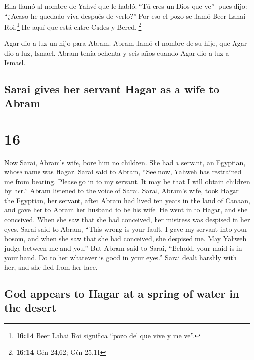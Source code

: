 \begin{paracol}{2}
 Ella llamó al nombre de Yahvé que le habló: ``Tú eres un
Dios que ve'', pues dijo: ``¿Acaso he quedado viva después de verlo?''
 Por eso el pozo se llamó Beer Lahai Roi.\footnote{\textbf{16:14}
  Beer Lahai Roi significa ``pozo del que vive y me ve''.} He aquí que
está entre Cades y Bered. \footnote{\textbf{16:14} Gén 24,62; Gén 25,11}

 Agar dio a luz un hijo para Abram. Abram llamó el nombre
de su hijo, que Agar dio a luz, Ismael.  Abram tenía
ochenta y seis años cuando Agar dio a luz a Ismael.

\switchcolumn
\begin{otherlanguage}{english}

\hypertarget{sarai-gives-her-servant-hagar-as-a-wife-to-abram}{%
\subsection{Sarai gives her servant Hagar as a wife to
Abram}\label{sarai-gives-her-servant-hagar-as-a-wife-to-abram}}

\hypertarget{section-31}{%
\section{16}\label{section-31}}

 Now Sarai, Abram's wife, bore him no children. She had a
servant, an Egyptian, whose name was Hagar.  Sarai said to
Abram, ``See now, Yahweh has restrained me from bearing. Please go in to
my servant. It may be that I will obtain children by her.'' Abram
listened to the voice of Sarai.  Sarai, Abram's wife, took
Hagar the Egyptian, her servant, after Abram had lived ten years in the
land of Canaan, and gave her to Abram her husband to be his wife.
 He went in to Hagar, and she conceived. When she saw that
she had conceived, her mistress was despised in her eyes. 
Sarai said to Abram, ``This wrong is your fault. I gave my servant into
your bosom, and when she saw that she had conceived, she despised me.
May Yahweh judge between me and you.''  But Abram said to
Sarai, ``Behold, your maid is in your hand. Do to her whatever is good
in your eyes.'' Sarai dealt harshly with her, and she fled from her
face.

\hypertarget{god-appears-to-hagar-at-a-spring-of-water-in-the-desert}{%
\subsection{God appears to Hagar at a spring of water in the
desert}\label{god-appears-to-hagar-at-a-spring-of-water-in-the-desert}}


\end{otherlanguage}
\end{paracol}
